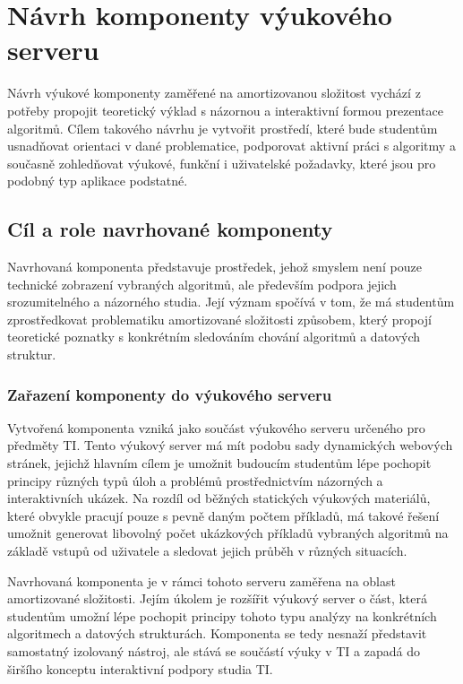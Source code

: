 \chapter{Návrh komponenty výukového serveru}
Návrh výukové komponenty zaměřené na amortizovanou složitost vychází z potřeby propojit teoretický výklad s názornou a interaktivní formou prezentace algoritmů. Cílem takového návrhu je vytvořit prostředí, které bude studentům usnadňovat orientaci v dané problematice, podporovat aktivní práci s algoritmy a současně zohledňovat výukové, funkční i uživatelské požadavky, které jsou pro podobný typ aplikace podstatné.


\section{Cíl a role navrhované komponenty}
Navrhovaná komponenta představuje prostředek, jehož smyslem není pouze technické zobrazení vybraných algoritmů, ale především podpora jejich srozumitelného a názorného studia. Její význam spočívá v tom, že má studentům zprostředkovat problematiku amortizované složitosti způsobem, který propojí teoretické poznatky s konkrétním sledováním chování algoritmů a datových struktur.

\subsection{Zařazení komponenty do výukového serveru}
Vytvořená komponenta vzniká jako součást výukového serveru určeného pro předměty TI. Tento výukový server má mít podobu sady dynamických webových stránek, jejichž hlavním cílem je umožnit budoucím studentům lépe pochopit principy různých typů úloh a problémů prostřednictvím názorných a interaktivních ukázek. Na rozdíl od běžných statických výukových materiálů, které obvykle pracují pouze s pevně daným počtem příkladů, má takové řešení umožnit generovat libovolný počet ukázkových příkladů vybraných algoritmů na základě vstupů od uživatele a sledovat jejich průběh v různých situacích.

Navrhovaná komponenta je v rámci tohoto serveru zaměřena na oblast amortizované složitosti. Jejím úkolem je rozšířit výukový server o část, která studentům umožní lépe pochopit principy tohoto typu analýzy na konkrétních algoritmech a datových strukturách. Komponenta se tedy nesnaží představit samostatný izolovaný nástroj, ale stává se součástí výuky v TI a zapadá do širšího konceptu interaktivní podpory studia TI.

